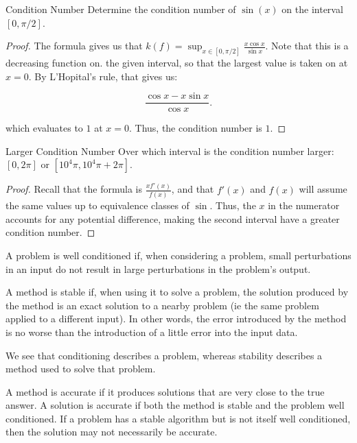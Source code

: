 \documentclass[../main.tex]{subfiles}
\begin{document}
\begin{problem}{Condition Number}
    Determine the condition number of $\sin(x)$ on the interval $[0 , \pi/2]$.
\end{problem}
\begin{proof}
    The formula gives us that $k(f) = \sup_{x \in [0, \pi/2]} \frac{x \cos x}{\sin x}$. Note that this is a decreasing function on.
    the given interval, so that the largest value is taken on at $x = 0$. By L'Hopital's rule, that gives us:

    \[
        \frac{\cos x - x \sin x}{\cos x}.
    \]

    which evaluates to $1$ at $x = 0$. Thus, the condition number is $1$.
\end{proof}

\begin{problem}{Larger Condition Number}
    Over which interval is the condition number larger: $[0, 2\pi]$ or $[10^4 \pi, 10^4 \pi + 2 \pi]$.
\end{problem}
\begin{proof}
    Recall that the formula is $\frac{x f'(x)}{f(x)}$, and that $f'(x)$ and $f(x)$ will assume the same values up to 
    equivalence classes of $\sin.$ Thus, the $x$ in the numerator accounts for any potential difference, making the second
    interval have a greater condition number.
\end{proof}

\begin{definition}
    A problem is well conditioned if, when considering a problem,
    small perturbations in an input do not result in large perturbations in the problem's output.
\end{definition}

\begin{definition}
    A method is stable if, when using it to solve a problem, the solution produced by the method is an exact solution to a nearby problem (ie the same problem applied to a different input). In other words, the error introduced by the method is no worse than the introduction of a little error into the input data.
\end{definition}


\begin{remark}
    We see that conditioning describes a problem, whereas stability describes a method used to solve that problem.
\end{remark}

\begin{definition}
    A method is accurate if it produces solutions that are very close to the true answer. A solution is accurate if both the method
    is stable and the problem well conditioned. If a problem has a stable algorithm but is not itself well conditioned, then 
    the solution may not necessarily be accurate.
\end{definition}
\end{document}
